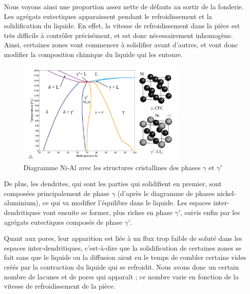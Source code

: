 Nous voyons ainsi une proportion assez nette de défauts au sortir de la fonderie. 
Les agrégats eutectiques apparaissent pendant le refroidissement 
et la solidification du liquide. En effet, la vitesse de refroidissement dans 
la pièce est très difficile à contrôler précisément, et est donc nécessairement
inhomogène. Ainsi, certaines zones vont commencer à solidifier avant d'autres, et 
vont donc modifier la composition chimique du liquide qui les entoure. 


\begin{figure}[htbp]
    \centering
    \includegraphics[width=0.75\textwidth]{images/diagramme_phase.png}
    \caption{Diagramme Ni-Al avec les structures cristallines des phases $\gamma$ et $\gamma'$}
    \label{<label>}
\end{figure}


De plus, les dendrites, qui sont les parties qui solidifient en premier, sont composées 
principalement de phase $\gamma$ (d'après le diagramme de phases nickel-aluminium), 
ce qui va modifier l'équilibre dans le liquide.
Les espaces inter-dendritiques vont ensuite se former,  plus riches en phase $\gamma'$, 
suivis enfin par les agrégats eutectiques composés de phase $\gamma'$.

Quant aux pores, leur apparition est liée à un flux trop faible de soluté 
dans les espaces inter-dendritiques, c'est-à-dire que la solidification de 
certaines zones se fait sans que le liquide ou la diffusion aient eu le 
temps de combler certains vides créés par la contraction du liquide qui
se refroidit. Nous avons donc un certain nombre de lacunes et de pores qui
apparaît ; ce nombre varie en fonction de la vitesse de refroidissement 
de la pièce.


